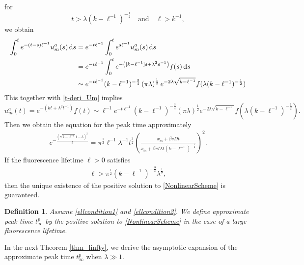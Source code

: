 \documentclass[10pt]{article}
\newtheorem{definition}[theorem]{Definition}
\numberwithin{equation}{section}
\numberwithin{figure}{section}
\begin{document}
for 
\begin{equation}
\label{ellcondition1}
t>\lambda (k-\ell^{-1})^{-\frac{1}{2}} \quad \mbox{and} \quad \ell > k^{-1},
\end{equation}
we obtain 
\begin{equation*}
\begin{split}
\int_0^t  e^{-(t-s)\ell^{-1}} u^a_m (s) \,{\rm d}s &= 
 e^{-t \ell^{-1}} \int_0^t e^{s\ell^{-1}} u^a_m (s) \,{\rm d}s \\
&=  e^{-t \ell^{-1}} \int_0^t  e^{-\left([k-\ell^{-1}]s + \lambda^2 s^{-1} \right)} f(s) \,{\rm d}s \\
&\sim e^{-t \ell^{-1}} (k-\ell^{-1})^{-\frac{3}{4}} \left( \pi \lambda \right)^\frac{1}{2} 
 e^{-2 \lambda \sqrt{k-\ell^{-1}}} f( \lambda (k-\ell^{-1})^{-\frac{1}{2}}) 
\end{split}
\end{equation*}
This together with \eqref{t-deri_Um} implies
$$
u_m^a(t) = e^{-(kt+\lambda^2 t^{-1})} f(t) \sim \ell^{-1} e^{-t \ell^{-1}}
(k-\ell^{-1})^{-\frac{3}{4}} \left( \pi \lambda \right)^\frac{1}{2} 
 e^{-2 \lambda \sqrt{k-\ell^{-1}}} f( \lambda (k-\ell^{-1})^{-\frac{1}{2}}). 
$$
Then we obtain the equation for the peak time approximately
\begin{equation}\label{NonlinearScheme}
\begin{split}
 e^{-\frac{(\sqrt{k-\ell^{-1}}t-\lambda)^2}{t}} = \pi^{\frac{1}{2}} \ell^{-1} \lambda^{-1} t^{\frac{3}{2}} \left(\frac{x_{c_3}+\beta vDt }{x_{c_3}+\beta vD \lambda (k-\ell^{-1})^{-\frac{1}{2}}}\right)^2.
\end{split}
\end{equation}
If the fluorescence lifetime $\ell>0$ satisfies
\begin{equation}\label{ellcondition2}
\begin{split}
\ell>\pi^{\frac{1}{2}}(k-\ell^{-1})^{-\frac{3}{4}}\lambda^{\frac{1}{2}},
\end{split}
\end{equation}
then the unique existence of the positive solution to \eqref{NonlinearScheme} is guaranteed.
\begin{definition}\label{def_linfty}
Assume \eqref{ellcondition1} and \eqref{ellcondition2}. We define approximate peak time $t^{p}_\infty$ by the positive solution to \eqref{NonlinearScheme} in the case of a large fluorescence lifetime.
\end{definition}
In the next Theorem \ref{thm_linfty}, we derive the asymptotic expansion of the approximate peak time $t^p_\infty$ when $\lambda \gg 1$.
\end{document}
